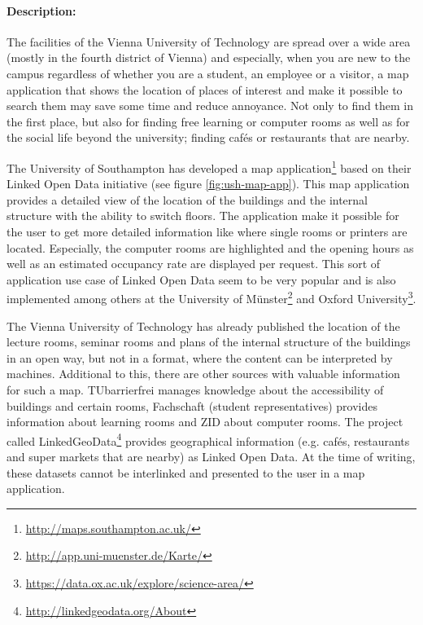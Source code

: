 \documentclass{article}
\begin{document}
\paragraph{Description:}
The facilities of the Vienna University of Technology are spread over a wide area (mostly in the fourth district of Vienna) and especially, when you are new to the campus regardless of whether you are a student, an employee or a visitor, a map application that
shows the location of places of interest and make it possible to search them may save some time and reduce annoyance. Not only to find them in the first place, but also for finding free learning or computer rooms as well as for the social life beyond the university; finding cafés or restaurants that are nearby.

The University of Southampton has developed a map application\footnote{\url{http://maps.southampton.ac.uk/}} based on their Linked Open Data initiative (see figure \ref{fig:ush-map-app}). This map application provides a detailed view of the location of the buildings and the internal structure with the ability to switch floors. The application make it possible for the user to get more detailed information like where single rooms or printers are located. Especially, the computer rooms are highlighted and the opening hours as well as an estimated occupancy rate are displayed per request. This sort of application use case of Linked Open Data seem to be very popular and is also implemented among others at the University of Münster\footnote{\url{http://app.uni-muenster.de/Karte/}} and Oxford University\footnote{\url{https://data.ox.ac.uk/explore/science-area/}}.

The Vienna University of Technology has already published the location of the lecture rooms, seminar rooms and plans of the internal structure of the buildings in an open way, but not in a format, where the content can be interpreted by machines. Additional to this, there are other sources with valuable information for such a map. TUbarrierfrei manages knowledge about the accessibility of buildings and certain rooms, Fachschaft (student representatives) provides information about learning rooms and ZID about computer rooms. The project called LinkedGeoData\footnote{\url{http://linkedgeodata.org/About}} provides geographical information (e.g. cafés, restaurants and super markets that are nearby) as Linked Open Data. At the time of writing, these datasets cannot be interlinked and presented to the user in a map application.
\end{document}
